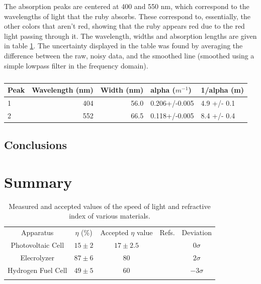 \documentclass[aps,prl,reprint]{revtex4-2}
\begin{document}
The absorption peaks are centered at 400 and 550 nm, which correspond to the wavelengths
of light that the ruby absorbs. These correspond to, essentially, the other colors 
that aren't red, showing that the ruby appears red due to the red light passing through
it. The wavelength, widths and absorption lengths are given in table \ref{abs}. The
uncertainty displayed in the table was found by averaging the difference between the
raw, noisy data, and the smoothed line (smoothed using a simple lowpass filter in the
frequency domain).

\begin{table}[h]
\begin{tabular}{lrrll}
\toprule
Peak &  Wavelength (nm) &  Width (nm) &          alpha ($m^{-1}$) &        1/alpha (m) \\
\hline
1 &              404 &        56.0 &  0.206+/-0.005 &  4.9 +/- 0.1   \\
2 &              552 &        66.5 &  0.118+/-0.005 &  8.4 +/- 0.4   \\
\hline
\hline
\end{tabular}
\caption{\label{abs}}
\end{table}

\newpage
\subsection{Conclusions}

\section{Summary}


\begin{widetext}
\begin{center}
\begin{table}[h]
\renewcommand{\arraystretch}{1.35}
\setlength{\tabcolsep}{10pt}
\caption{\label{}Measured and accepted values of the speed of light and refractive index of various materials.}
\begin{tabular}{|c|c|c|c|c|}
\toprule
Apparatus &  $\eta$ (\%) & Accepted $\eta$ value & Refs. & Deviation \\
\colrule
Photovoltaic Cell &  $15 \pm 2$ & $17 \pm 2.5$ & \cite{Solar Cell} & $0\sigma$  \\
\colrule
Elecrolyzer &  $87 \pm 6$ & 80 & \cite{Electrolyzer} & $2\sigma$  \\
\colrule
Hydrogen Fuel Cell &  $49 \pm 5$ & 60 & \cite{Fuel Cell} & $-3\sigma$  \\
\botrule
\end{tabular}
\end{table}
\end{center}
\end{widetext}
\end{document}
